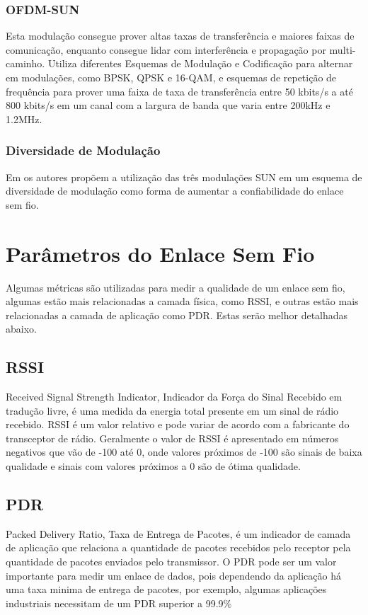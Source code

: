 \subsubsection*{OFDM-SUN}
Esta modulação consegue prover altas taxas de transferência e maiores faixas de comunicação, enquanto consegue lidar com interferência e propagação por multi-caminho. Utiliza diferentes Esquemas de Modulação e Codificação para alternar em modulações, como BPSK, QPSK e 16-QAM, e esquemas de repetição de frequência para prover uma faixa de taxa de transferência entre 50 kbits/s a até 800 kbits/s em um canal com a largura de banda que varia entre 200kHz e 1.2MHz.

\subsubsection*{Diversidade de Modulação}
Em \cite{gomes2020improving} os autores propõem a utilização das três modulações SUN em um esquema de diversidade de modulação como forma de aumentar a confiabilidade do enlace sem fio.

\section{Parâmetros do Enlace Sem Fio}
\label{paramSF}
Algumas métricas são utilizadas para medir a qualidade de um enlace sem fio, algumas estão mais relacionadas a camada física, como RSSI, e outras estão mais relacionadas a camada de aplicação como PDR. Estas serão melhor detalhadas abaixo.
\subsection*{RSSI}
Received Signal Strength Indicator, Indicador da Força do Sinal Recebido em tradução livre, é uma medida da energia total presente em um sinal de rádio recebido. RSSI é um valor relativo e pode variar de acordo com a fabricante do transceptor de rádio\cite{UNDERSTANDING_RSSI}. Geralmente o valor de RSSI é apresentado em números negativos que vão de -100 até 0, onde valores próximos de -100 são sinais de baixa qualidade e sinais com valores próximos a 0 são de ótima qualidade.

\subsection*{PDR}
Packed Delivery Ratio, Taxa de Entrega de Pacotes, é um indicador de camada de aplicação que relaciona a quantidade de pacotes recebidos pelo receptor pela quantidade de pacotes enviados pelo transmissor. O PDR pode ser um valor importante para medir um enlace de dados, pois dependendo da aplicação há uma taxa minima de entrega de pacotes, por exemplo, algumas aplicações industriais necessitam de um PDR superior a 99.9\%

